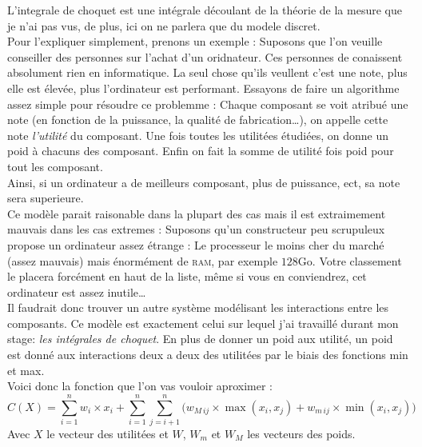 
L'integrale de choquet est une intégrale découlant de la théorie de la mesure que je n'ai pas vus,
de plus, ici on ne parlera que du modele discret.\\


Pour l'expliquer simplement, prenons un exemple :
Suposons que l'on veuille conseiller des personnes sur l'achat d'un oridnateur.
Ces personnes de conaissent absolument rien en informatique.
La seul chose qu'ils veullent c'est une note, plus elle est élevée, plus l'ordinateur est performant.
Essayons de faire un algorithme assez simple pour résoudre ce problemme :
Chaque composant se voit atribué une note (en fonction de la puissance, la qualité de fabrication\ldots),
on appelle cette note \textit{l'utilité} du composant.
Une fois toutes les utilitées étudiées, on donne un poid à chacuns des composant.
Enfin on fait la somme de utilité fois poid pour tout les composant.\\
Ainsi, si un ordinateur a de meilleurs composant, plus de puissance, ect, sa note sera superieure.\\


Ce modèle parait raisonable dans la plupart des cas mais il est extraimement mauvais dans les cas extremes :
Suposons qu'un constructeur peu scrupuleux propose un ordinateur assez étrange :
Le processeur le moins cher du marché (assez mauvais) mais énormément de \textsc{ram}, par exemple $128$Go.
Votre classement le placera forcément en haut de la liste, même si vous en conviendrez,
cet ordinateur est assez inutile\ldots\\


Il faudrait donc trouver un autre système modélisant les interactions entre les composants.
Ce modèle est exactement celui sur lequel j'ai travaillé durant mon stage: \textit{les intégrales de choquet}.
En plus de donner un poid aux utilité,
un poid est donné aux interactions deux a deux des utilitées par le biais des fonctions min et max.\\


Voici donc la fonction que l'on vas vouloir aproximer :
\begin{equation}
    \label{choquet}
    C(X)  =
    \sum_{i=1}^{n}
        w_i \times x_i +
    \sum_{i=1}^{n}\sum_{j=i+1}^{n}
    \Big(
        w_{M\,ij} \times \max(x_i,x_j) + w_{m\,ij} \times \min(x_i,x_j)
    \Big)
\end{equation}
Avec $X$ le vecteur des utilitées et $W$, $W_m$ et $W_M$ les vecteurs des poids.